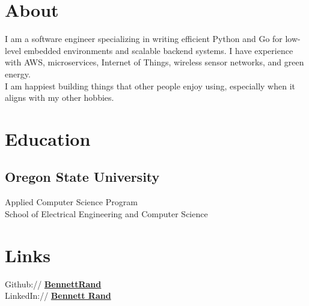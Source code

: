 \documentclass[letterpaper]{deedy-resume} %
\begin{document}
\begin{minipage}[t]{0.33\textwidth} %


\section{About}
I am a software engineer specializing in writing efficient Python and Go for low-level embedded environments and scalable backend systems.
I have experience with AWS, microservices, Internet of Things, wireless sensor networks, and green energy.\\[1em]
I am happiest building things that other people enjoy using, especially when it aligns with my other hobbies.
\sectionspace


\section{Education} 

\subsection{Oregon State University}

Applied Computer Science Program \\
School of Electrical Engineering and Computer Science \\


\sectionspace %


\section{Links} 

Github:// \href{https://github.com/BennettRand}{\bf BennettRand} \\
LinkedIn:// \href{https://www.linkedin.com/pub/bennett-rand/51/76a/679}{\bf Bennett Rand} \\


\end{minipage}
\end{document}
